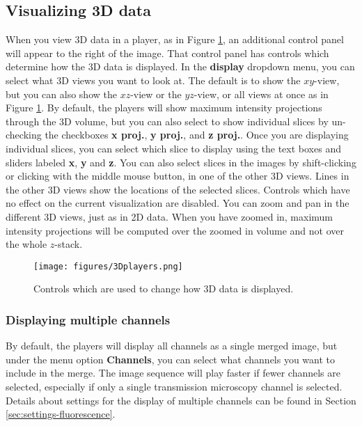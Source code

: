 \documentclass[a4paper, oneside, onecolumn, 11pt]{article}
\newcommand{\menu}[1]{\textbf{#1}}
\newcommand{\control}[1]{\textbf{#1}}
\begin{document}
\subsection{Visualizing 3D data}
When you view 3D data in a player, as in Figure \ref{fig:3D-players}, an additional control panel will appear to the right of the image. That control panel has controls which determine how the 3D data is displayed. In the \control{display} dropdown menu, you can select what 3D views you want to look at. The default is to show the $xy$-view, but you can also show the $xz$-view or the $yz$-view, or all views at once as in Figure \ref{fig:3D-players}. By default, the players will show maximum intensity projections through the 3D volume, but you can also select to show individual slices by un-checking the checkboxes \control{x proj.}, \control{y proj.}, and \control{z proj.}. Once you are displaying individual slices, you can select which slice to display using the text boxes and sliders labeled \control{x}, \control{y} and \control{z}. You can also select slices in the images by shift-clicking or clicking with the middle mouse button, in one of the other 3D views. Lines in the other 3D views show the locations of the selected slices. Controls which have no effect on the current visualization are disabled. You can zoom and pan in the different 3D views, just as in 2D data. When you have zoomed in, maximum intensity projections will be computed over the zoomed in volume and not over the whole $z$-stack.

\begin{figure}[!ht]
\begin{center}
\texttt{[image: figures/3Dplayers.png]}
\caption{Controls which are used to change how 3D data is displayed.}
\label{fig:3D-players}
\end{center}
\end{figure}

\subsubsection{Displaying multiple channels}
By default, the players will display all channels as a single merged image, but under the menu option \menu{Channels}, you can select what channels you want to include in the merge. The image sequence will play faster if fewer channels are selected, especially if only a single transmission microscopy channel is selected. Details about settings for the display of multiple channels can be found in Section \ref{sec:settings-fluorescence}.
\end{document}
